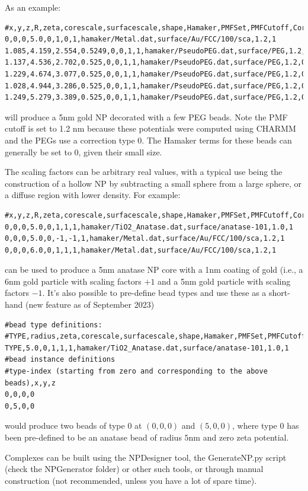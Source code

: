 \documentclass[10pt,a4paper,onecolumn]{report}
\begin{document}
As an example:
\begin{lstlisting}
#x,y,z,R,zeta,corescale,surfacescale,shape,Hamaker,PMFSet,PMFCutoff,Correction
0,0,0,5.0,0,1,0,1,hamaker/Metal.dat,surface/Au/FCC/100/sca,1.2,1
1.085,4.159,2.554,0.5249,0,0,1,1,hamaker/PseudoPEG.dat,surface/PEG,1.2,0
1.137,4.536,2.702,0.525,0,0,1,1,hamaker/PseudoPEG.dat,surface/PEG,1.2,0
1.229,4.674,3.077,0.525,0,0,1,1,hamaker/PseudoPEG.dat,surface/PEG,1.2,0
1.028,4.944,3.286,0.525,0,0,1,1,hamaker/PseudoPEG.dat,surface/PEG,1.2,0
1.249,5.279,3.389,0.525,0,0,1,1,hamaker/PseudoPEG.dat,surface/PEG,1.2,0
\end{lstlisting}
will produce a 5nm gold NP decorated with a few PEG beads. Note the PMF cutoff is set to 1.2 nm because these potentials were computed using CHARMM and the PEGs use a correction type 0. The Hamaker terms for these beads can generally be set to 0, given their small size. 




The scaling factors can be arbitrary real values, with a typical use being the construction of a hollow NP by subtracting a small sphere from a large sphere, or a diffuse region with lower density. For example:
\begin{lstlisting}
#x,y,z,R,zeta,corescale,surfacescale,shape,Hamaker,PMFSet,PMFCutoff,Correction
0,0,0,5.0,0,1,1,1,hamaker/TiO2_Anatase.dat,surface/anatase-101,1.0,1
0,0,0,5.0,0,-1,-1,1,hamaker/Metal.dat,surface/Au/FCC/100/sca,1.2,1
0,0,0,6.0,0,1,1,1,hamaker/Metal.dat,surface/Au/FCC/100/sca,1.2,1
\end{lstlisting}
can be used to produce a 5nm anatase NP core with a 1nm coating of gold (i.e., a 6nm gold particle with scaling factors $+1$ and a 5nm gold particle with scaling factors $-1$. It's also possible to pre-define bead types and use these as a short-hand (new feature as of September 2023)
\begin{lstlisting}
#bead type definitions:
#TYPE,radius,zeta,corescale,surfacescale,shape,Hamaker,PMFSet,PMFCutoff,Correction
TYPE,5.0,0,1,1,1,hamaker/TiO2_Anatase.dat,surface/anatase-101,1.0,1
#bead instance definitions
#type-index (starting from zero and corresponding to the above beads),x,y,z
0,0,0,0
0,5,0,0
\end{lstlisting}
would produce two beads of type $0$ at $(0,0,0)$ and $(5,0,0)$, where type $0$ has been pre-defined to be an anatase bead of radius $5$nm and zero zeta potential. 

Complexes can be built using the NPDesigner tool, the  GenerateNP.py script (check the NPGenerator folder) or other such tools, or through manual construction (not recommended, unless you have a lot of spare time). 
\end{document}
